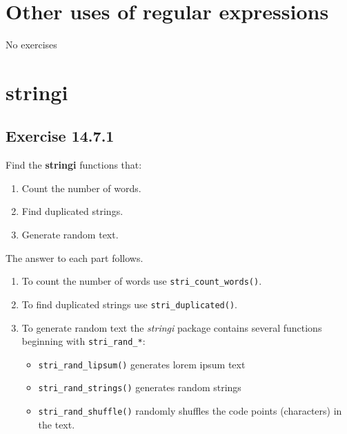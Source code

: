 \documentclass[]{book}
\providecommand{\tightlist}{%
  \setlength{\itemsep}{0pt}\setlength{\parskip}{0pt}}
\theoremstyle{plain}
\theoremstyle{remark}
\begin{document}
\hypertarget{other-uses-of-regular-expressions}{%
\section{Other uses of regular
expressions}\label{other-uses-of-regular-expressions}}

No exercises

\hypertarget{stringi}{%
\section{stringi}\label{stringi}}

\hypertarget{exercise-14.7.1}{%
\subsection*{\texorpdfstring{Exercise
{14.7.1}}{Exercise 14.7.1}}\label{exercise-14.7.1}}

Find the \textbf{stringi} functions that:

\begin{enumerate}
\def\labelenumi{\arabic{enumi}.}
\tightlist
\item
  Count the number of words.
\item
  Find duplicated strings.
\item
  Generate random text.
\end{enumerate}

The answer to each part follows.

\begin{enumerate}
\def\labelenumi{\arabic{enumi}.}
\item
  To count the number of words use \texttt{stri\_count\_words()}.
\item
  To find duplicated strings use \texttt{stri\_duplicated()}.
\item
  To generate random text the \emph{stringi} package contains several
  functions beginning with \texttt{stri\_rand\_*}:

  \begin{itemize}
  \tightlist
  \item
    \texttt{stri\_rand\_lipsum()} generates lorem ipsum text
  \item
    \texttt{stri\_rand\_strings()} generates random strings
  \item
    \texttt{stri\_rand\_shuffle()} randomly shuffles the code points
    (characters) in the text.
  \end{itemize}
\end{enumerate}
\end{document}
